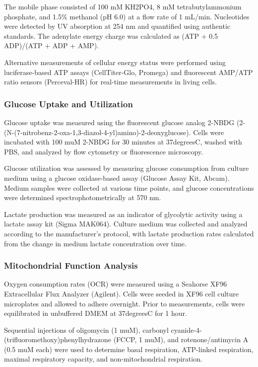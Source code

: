 \documentclass[11pt,a4paper]{article}
\begin{document}
The mobile phase consisted of 100 mM KH2PO4, 8 mM tetrabutylammonium phosphate, and 1.5\% methanol (pH 6.0) at a flow rate of 1 mL/min. Nucleotides were detected by UV absorption at 254 nm and quantified using authentic standards. The adenylate energy charge was calculated as (ATP + 0.5 ADP)/(ATP + ADP + AMP).

Alternative measurements of cellular energy status were performed using luciferase-based ATP assays (CellTiter-Glo, Promega) and fluorescent AMP/ATP ratio sensors (Perceval-HR) for real-time measurements in living cells.

\subsubsection{Glucose Uptake and Utilization}

Glucose uptake was measured using the fluorescent glucose analog 2-NBDG (2-(N-(7-nitrobenz-2-oxa-1,3-diazol-4-yl)amino)-2-deoxyglucose). Cells were incubated with 100 muM 2-NBDG for 30 minutes at 37degreesC, washed with PBS, and analyzed by flow cytometry or fluorescence microscopy.

Glucose utilization was assessed by measuring glucose consumption from culture medium using a glucose oxidase-based assay (Glucose Assay Kit, Abcam). Medium samples were collected at various time points, and glucose concentrations were determined spectrophotometrically at 570 nm.

Lactate production was measured as an indicator of glycolytic activity using a lactate assay kit (Sigma MAK064). Culture medium was collected and analyzed according to the manufacturer's protocol, with lactate production rates calculated from the change in medium lactate concentration over time.

\subsubsection{Mitochondrial Function Analysis}

Oxygen consumption rates (OCR) were measured using a Seahorse XF96 Extracellular Flux Analyzer (Agilent). Cells were seeded in XF96 cell culture microplates and allowed to adhere overnight. Prior to measurements, cells were equilibrated in unbuffered DMEM at 37degreesC for 1 hour.

Sequential injections of oligomycin (1 muM), carbonyl cyanide-4-(trifluoromethoxy)phenylhydrazone (FCCP, 1 muM), and rotenone/antimycin A (0.5 muM each) were used to determine basal respiration, ATP-linked respiration, maximal respiratory capacity, and non-mitochondrial respiration.
\end{document}
